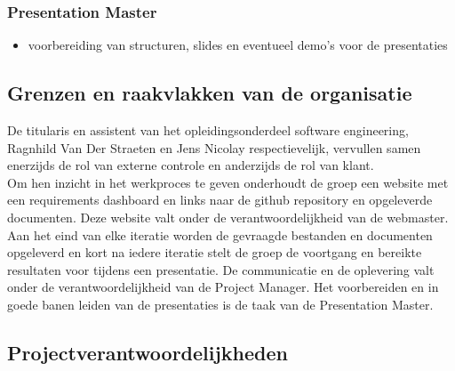 \documentclass{article}
\begin{document}
\subsubsection*{Presentation Master}
\begin{itemize}
\item voorbereiding van structuren, slides en eventueel demo's voor de presentaties
\end{itemize}


\subsection{Grenzen en raakvlakken van de organisatie}

De titularis en assistent van het opleidingsonderdeel software engineering, Ragnhild Van Der Straeten en Jens Nicolay respectievelijk, vervullen samen enerzijds de rol van externe controle en anderzijds de rol van klant. \\

\noindent Om hen inzicht in het werkproces te geven onderhoudt de groep een website met een requirements dashboard en links naar de github repository en opgeleverde documenten. Deze website valt onder de verantwoordelijkheid van de webmaster.  \\

\noindent Aan het eind van elke iteratie worden de gevraagde bestanden en documenten opgeleverd en kort na iedere iteratie stelt de groep de voortgang en bereikte resultaten voor tijdens een presentatie. De communicatie en de oplevering valt onder de verantwoordelijkheid van de Project Manager. Het voorbereiden en in goede banen leiden van de presentaties is de taak van de Presentation Master. 

 \clearpage

\subsection{Projectverantwoordelijkheden}

\end{document}

